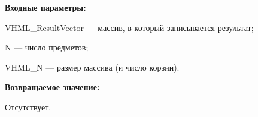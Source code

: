 \textbf{Входные параметры:} 
 
VHML\_ResultVector --- массив, в который записывается результат;
 
N --- число предметов;
 
VHML\_N --- размер массива (и число корзин).

\textbf{Возвращаемое значение:}

Отсутствует.